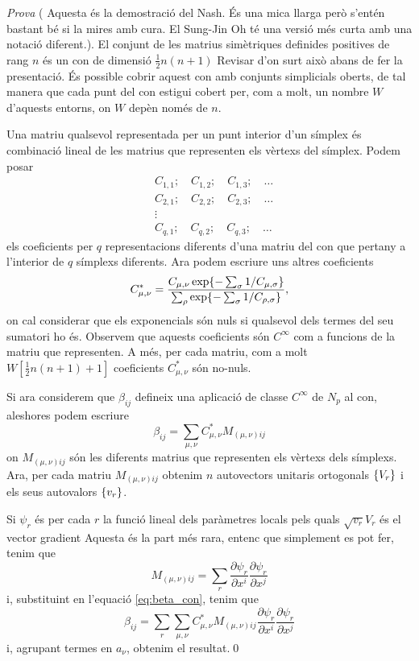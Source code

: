 {\color{green!50!black}\textit{Prova} ({\color{blue} Aquesta és la demostració del Nash. És una mica llarga però s'entén bastant bé si la mires amb cura. El Sung-Jin Oh té una versió més curta amb una notació diferent.}).
El conjunt de les matrius simètriques definides positives de rang $n$ és un con de dimensió $\frac12n(n+1)${ \color{blue} Revisar d'on surt això abans de fer la presentació}. És possible cobrir aquest con amb conjunts simplicials oberts, de tal manera que cada punt del con estigui cobert per, com a molt, un nombre $W$ d'aquests entorns, on $W$ depèn només de $n$. 

Una matriu qualsevol representada per un punt interior d'un símplex és combinació lineal de les matrius que representen els vèrtexs del símplex. Podem posar
$$\begin{aligned}
    &C_{1,1}; \quad C_{1,2}; \quad C_{1,3}; \quad \dots\\
    &C_{2,1}; \quad C_{2,2}; \quad C_{2,3}; \quad \dots\\
    &\vdots\\
    &C_{q,1}; \quad C_{q,2}; \quad C_{q,3}; \quad \dots
\end{aligned}$$
els coeficients per $q$ representacions diferents d'una matriu del con que pertany a l'interior de $q$ símplexs diferents. 
Ara podem escriure uns altres coeficients
$$ C_{\mu,\nu}^* = \frac{C_{\mu,\nu} \exp\{-\sum_\sigma 1/C_{\mu,\sigma}\}}{\sum_{\rho}\exp\{-\sum_\sigma 1/C_{\rho,\sigma}\}}, $$ on cal considerar que els exponencials són nuls si qualsevol dels termes del seu sumatori ho és. 
Observem que aquests coeficients són $C^\infty$ com a funcions de la matriu que representen. A més, per cada matriu, com a molt $W[\frac12n(n+1)+1]$ coeficients $C_{\mu,\nu}^*$ són no-nuls.

Si ara considerem que $\beta_{ij}$ defineix una aplicació de classe $C^\infty$ de $N_p$ al con, aleshores podem escriure 
\begin{equation}\label{eq:beta_con}
    \beta_{ij} = \sum_{\mu,\nu}C_{\mu,\nu}^*M_{(\mu,\nu)ij}
\end{equation}
on $M_{(\mu,\nu)ij}$ són les diferents matrius que representen els vèrtexs dels símplexs. Ara, per cada matriu $M_{(\mu,\nu)ij}$ obtenim $n$ autovectors unitaris ortogonals $\{V_r\}$ i els seus autovalors $\{v_r\}$.

Si $\psi_r$ és per cada $r$ la funció lineal dels paràmetres locals pels quals $\sqrt{v_r}V_r$ és el vector gradient {\color{blue}Aquesta és la part més rara, entenc que simplement es pot fer}, tenim que
\begin{equation*}
    M_{(\mu,\nu)ij} = \sum_{r}\frac{\partial\psi_r}{\partial x^i}\frac{\partial\psi_r}{\partial x^j}
\end{equation*}
i, substituint en l'equació \ref{eq:beta_con}, tenim que
\begin{equation*}
    \beta_{ij} = \sum_{r}\sum_{\mu,\nu}C_{\mu,\nu}^*M_{(\mu,\nu)ij}\frac{\partial\psi_r}{\partial x^i}\frac{\partial\psi_r}{\partial x^j}
\end{equation*}
i, agrupant termes en $a_\nu$, obtenim el resultat.\qed
}

